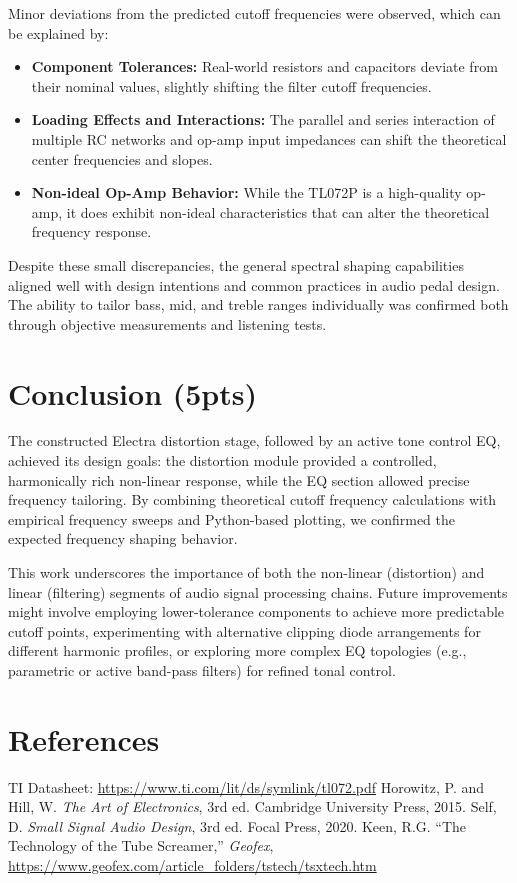 \documentclass[12pt,a4paper]{article}
\begin{document}
Minor deviations from the predicted cutoff frequencies were observed, which can be explained by:
\begin{itemize}
    \item \textbf{Component Tolerances:} Real-world resistors and capacitors deviate from their nominal values, slightly shifting the filter cutoff frequencies.
    \item \textbf{Loading Effects and Interactions:} The parallel and series interaction of multiple RC networks and op-amp input impedances can shift the theoretical center frequencies and slopes.
    \item \textbf{Non-ideal Op-Amp Behavior:} While the TL072P is a high-quality op-amp, it does exhibit non-ideal characteristics that can alter the theoretical frequency response.
\end{itemize}

Despite these small discrepancies, the general spectral shaping capabilities aligned well with design intentions and common practices in audio pedal design. The ability to tailor bass, mid, and treble ranges individually was confirmed both through objective measurements and listening tests.

\section{Conclusion (5pts)}
The constructed Electra distortion stage, followed by an active tone control EQ, achieved its design goals: the distortion module provided a controlled, harmonically rich non-linear response, while the EQ section allowed precise frequency tailoring. By combining theoretical cutoff frequency calculations with empirical frequency sweeps and Python-based plotting, we confirmed the expected frequency shaping behavior.

This work underscores the importance of both the non-linear (distortion) and linear (filtering) segments of audio signal processing chains. Future improvements might involve employing lower-tolerance components to achieve more predictable cutoff points, experimenting with alternative clipping diode arrangements for different harmonic profiles, or exploring more complex EQ topologies (e.g., parametric or active band-pass filters) for refined tonal control.

\section*{References}
\begin{thebibliography}{9}
     TI Datasheet: \url{https://www.ti.com/lit/ds/symlink/tl072.pdf}
     Horowitz, P. and Hill, W. \textit{The Art of Electronics}, 3rd ed. Cambridge University Press, 2015.
     Self, D. \textit{Small Signal Audio Design}, 3rd ed. Focal Press, 2020.
     Keen, R.G. ``The Technology of the Tube Screamer,'' \textit{Geofex}, \url{https://www.geofex.com/article_folders/tstech/tsxtech.htm}
\end{thebibliography}
\end{document}
